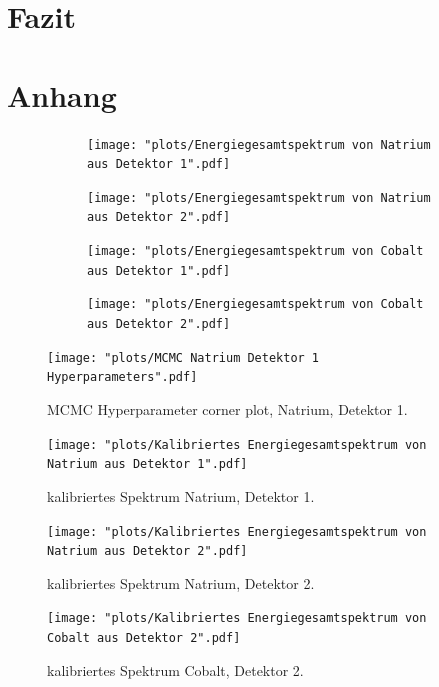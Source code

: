 \documentclass[%
aps,
onecolumn,
11pt,
tightenlines,
nofootinbib,
superscriptaddress,
floatfix,
prd,
]{revtex4-2}
\begin{document}




\section{Fazit}
\label{sec:Fazit}




\section{Anhang}
\label{sec:Anhang}
\begin{figure}[ht]
	\label{fig:initialplotsSo}
	\begin{subfigure}[c]{0.8\textwidth}
		\texttt{[image: "plots/Energiegesamtspektrum von Natrium aus Detektor 1".pdf]}
	\end{subfigure}

	\begin{subfigure}[c]{0.8\textwidth}
		\texttt{[image: "plots/Energiegesamtspektrum von Natrium aus Detektor 2".pdf]}
	\end{subfigure}
\end{figure}

\begin{figure}[ht]
	\label{fig:initialplotsCo}
	\begin{subfigure}[c]{0.8\textwidth}
		\texttt{[image: "plots/Energiegesamtspektrum von Cobalt aus Detektor 1".pdf]}
	\end{subfigure}

	\begin{subfigure}[c]{0.8\textwidth}
		\texttt{[image: "plots/Energiegesamtspektrum von Cobalt aus Detektor 2".pdf]}
	\end{subfigure}

\end{figure}
\begin{figure}		
	\texttt{[image: "plots/MCMC Natrium Detektor 1 Hyperparameters".pdf]}
	\caption{MCMC Hyperparameter corner plot, Natrium, Detektor 1.}
\end{figure}

\begin{figure}		
	\texttt{[image: "plots/Kalibriertes Energiegesamtspektrum von Natrium aus Detektor 1".pdf]}
	\caption{kalibriertes Spektrum Natrium, Detektor 1.}
	\label{fig:calibratedsodium1}
\end{figure}
\begin{figure}		
	\texttt{[image: "plots/Kalibriertes Energiegesamtspektrum von Natrium aus Detektor 2".pdf]}
	\caption{kalibriertes Spektrum Natrium, Detektor 2.}
\end{figure}
\begin{figure}		
	\texttt{[image: "plots/Kalibriertes Energiegesamtspektrum von Cobalt aus Detektor 2".pdf]}
	\caption{kalibriertes Spektrum Cobalt, Detektor 2.}
	\label{fig:calibratedcobalt2}
\end{figure}
\end{document}
